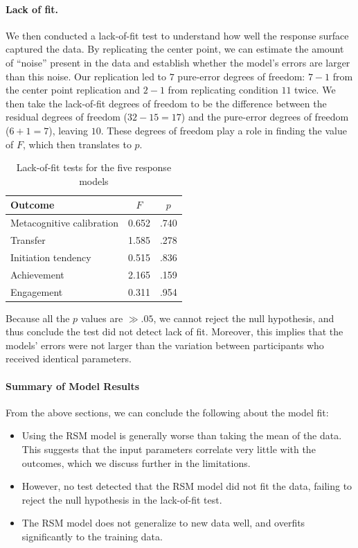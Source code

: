 \documentclass[12pt]{article}
\begin{document}
\paragraph{Lack of fit.}

We then conducted a lack-of-fit test to understand how well the response surface captured the data. By replicating the center point, we can estimate the amount of ``noise'' present in the data and establish whether the model's errors are larger than this noise. Our replication led to $7$ pure-error degrees of freedom: $7-1$ from the center point replication and $2-1$ from replicating condition $11$ twice. We then take the lack-of-fit degrees of freedom to be the difference between the residual degrees of freedom ($32-15=17$) and the pure-error degrees of freedom ($6+1=7$), leaving $10$. These degrees of freedom play a role in finding the value of $F$, which then translates to $p$.
\begin{table}[htbp]
    \centering
    \caption{Lack-of-fit tests for the five response models}
    \label{tab:lack-of-fit}
    \begin{tabular}{lcc}
        \toprule
        Outcome & $F$ & $p$ \\
        \midrule
        Metacognitive calibration & 0.652 & .740 \\
        Transfer                  & 1.585 & .278 \\
        Initiation tendency       & 0.515 & .836 \\
        Achievement               & 2.165 & .159 \\
        Engagement                & 0.311 & .954 \\
        \bottomrule
    \end{tabular}

    \vspace{0.5em}

\end{table}

Because all the $p$ values are $\gg .05$, we cannot reject the null hypothesis, and thus conclude the test did not detect lack of fit. Moreover, this implies that the models' errors were not
larger than the variation between participants who received identical
parameters. 

\paragraph{Summary of Model Results}

From the above sections, we can conclude the following about the model fit:
\begin{itemize}
    \item Using the RSM model is generally worse than taking the mean of the data. This suggests that the input parameters correlate very little with the outcomes, which we discuss further in the limitations.
    \item However, no test detected that the RSM model did not fit the data, failing to reject the null hypothesis in the lack-of-fit test.
    \item The RSM model does not generalize to new data well, and overfits significantly to the training data.
\end{itemize}
\end{document}

